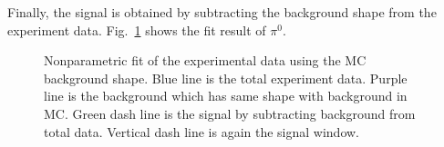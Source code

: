 Finally, the signal is obtained by subtracting the background shape from the experiment data. Fig.~\ref{fig:pi0_fit} shows the fit result of $\pi^0$.  
\begin{figure}[H]
  \centering     
  \caption{Nonparametric fit of the experimental data using the MC background shape. Blue line is the total experiment data. Purple line is the background which has same shape with background in MC. Green dash line is the signal by subtracting background from total data. Vertical dash line is again the signal window. }
  \label{fig:pi0_fit}
\end{figure}

